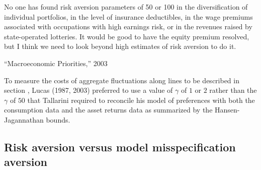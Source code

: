 \epigraph{No one has found risk aversion parameters of 50 or 100
in the diversification of individual portfolios, in the level of
insurance deductibles, in the wage premiums associated with
occupations with high earnings risk, or in the revenues raised by
state-operated lotteries. It would be good to have the equity
premium resolved, but I think we need to look beyond high
estimates of risk aversion to do it.} {``Macroeconomic Priorities,'' 2003}

To  measure the costs of aggregate fluctuations
along lines to be described in section , Lucas (1987, 2003) preferred to use a value of $\gamma$ of $1$ or $2$ rather than
the $\gamma$ of $50$ that Tallarini required to reconcile his model of preferences with  both the consumption data  and the asset returns data
as summarized by the Hansen-Jagannathan bounds.
%
%
%
%

\subsection{Risk aversion versus model misspecification aversion}

